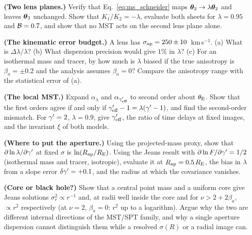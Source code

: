 \begin{exercise}
\label{ex:ms_schneider}
\textbf{(Two lens planes.)}  Verify that Eq.~\eqref{eq:ms_schneider} maps
$\boldsymbol{\theta}_2\to\lambda\boldsymbol{\theta}_2$ and leaves $\boldsymbol{\theta}_3$ unchanged.  Show
that $K_1/K_2=-\lambda$, evaluate both sheets for $\lambda=0.95$ and
$\mathcal{B}=0.7$, and show that no MST acts on the second lens plane alone.
\end{exercise}

\begin{exercise}
\label{ex:ms_sigma_budget}
\textbf{(The kinematic error budget.)}  A lens has
$\sigma_{\rm ap}=250\pm10$~km\,s$^{-1}$.  (a) What is $\Delta\lambda/\lambda$?
(b) What dispersion precision would give $1\%$ in $\lambda$?  (c) For an
isothermal mass and tracer, by how much is $\lambda$ biased if the true
anisotropy is $\beta_a=\pm0.2$ and the analysis assumes $\beta_a=0$?  Compare
the anisotropy range with the statistical error of (a).
\end{exercise}

\begin{exercise}
\label{ex:ms_local}
\textbf{(The local MST.)}  Expand $\alpha_\lambda$ and $\alpha_{\gamma'_{\rm eff}}$
to second order about $\theta_{\mathrm{E}}$.  Show that the first orders agree if and only
if $\gamma'_{\rm eff}-1=\lambda(\gamma'-1)$, and find the second-order mismatch.  For
$\gamma'=2$, $\lambda=0.9$, give $\gamma'_{\rm eff}$, the ratio of time delays at fixed
images, and the invariant $\xi$ of both models.
\end{exercise}

\begin{exercise}
\label{ex:ms_aperture}
\textbf{(Where to put the aperture.)}  Using the projected-mass proxy, show
that $\partial\ln\lambda/\partial\gamma'$ at fixed $\sigma$ is $\ln(R_{\rm ap}/R_{\rm E})$.
Using the Jeans result with $\partial\ln F/\partial\gamma'=1/2$ (isothermal mass
and tracer, isotropic), evaluate it at $R_{\rm ap}=0.5\,R_{\rm E}$, the bias in
$\lambda$ from a slope error $\delta\gamma'=+0.1$, and the radius at which the
covariance vanishes.
\end{exercise}

\begin{exercise}
\label{ex:ms_core_vs_bh}
\textbf{(Core or black hole?)}  Show that a central point mass and a uniform
core give Jeans solutions $\sigma_r^2\propto r^{-1}$ and, at radii well
inside the core and for $\nu>2+2\beta_a$, $\propto r^{2}$ respectively (at
$\nu=2$, $\beta_a=0$: $r^2$ up to a logarithm).  Argue why the two are different internal directions of the
MST/SPT family, and why a single aperture dispersion cannot distinguish them
while a resolved $\sigma(R)$ or a radial image can.
\end{exercise}

